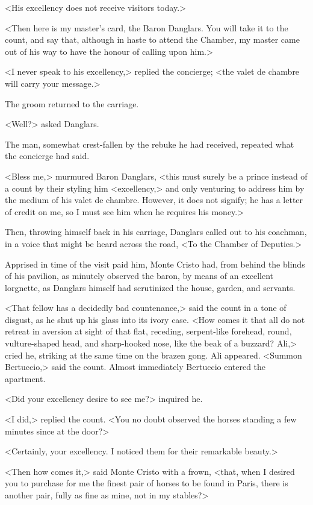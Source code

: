  <His excellency does not receive visitors today.> 

 <Then here is my master's card, the Baron Danglars. You will take it to the count, and say that, although in haste to attend the Chamber, my master came out of his way to have the honour of calling upon him.> 

 <I never speak to his excellency,> replied the concierge; <the valet de chambre will carry your message.> 

 The groom returned to the carriage. 

 <Well?> asked Danglars. 

 The man, somewhat crest-fallen by the rebuke he had received, repeated what the concierge had said. 

 <Bless me,> murmured Baron Danglars, <this must surely be a prince instead of a count by their styling him <excellency,> and only venturing to address him by the medium of his valet de chambre. However, it does not signify; he has a letter of credit on me, so I must see him when he requires his money.> 

 Then, throwing himself back in his carriage, Danglars called out to his coachman, in a voice that might be heard across the road, <To the Chamber of Deputies.> 

 Apprised in time of the visit paid him, Monte Cristo had, from behind the blinds of his pavilion, as minutely observed the baron, by means of an excellent lorgnette, as Danglars himself had scrutinized the house, garden, and servants. 

 <That fellow has a decidedly bad countenance,> said the count in a tone of disgust, as he shut up his glass into its ivory case. <How comes it that all do not retreat in aversion at sight of that flat, receding, serpent-like forehead, round, vulture-shaped head, and sharp-hooked nose, like the beak of a buzzard? Ali,> cried he, striking at the same time on the brazen gong. Ali appeared. <Summon Bertuccio,> said the count. Almost immediately Bertuccio entered the apartment. 

 <Did your excellency desire to see me?> inquired he. 

 <I did,> replied the count. <You no doubt observed the horses standing a few minutes since at the door?> 

 <Certainly, your excellency. I noticed them for their remarkable beauty.> 

 <Then how comes it,> said Monte Cristo with a frown, <that, when I desired you to purchase for me the finest pair of horses to be found in Paris, there is another pair, fully as fine as mine, not in my stables?> 

